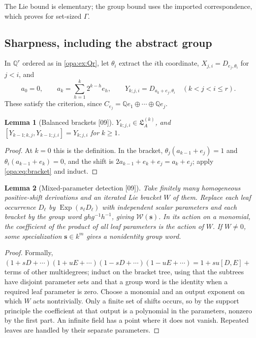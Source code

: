 \documentclass[11pt,oneside]{article}
\numberwithin{equation}{section}
\newtheorem{lemma}[lemma]{Lemma}
\theoremstyle{definition}
\theoremstyle{remark}
\newcommand{\Q}{\mathbb Q}
\newcommand{\LL}{\mathfrak L}
\newcommand{\Exp}{\operatorname{Exp}}
\newcommand{\src}[1]{\textup{\textsf{\small[#1]}}}
\begin{document}
The Lie bound is elementary; the group bound uses the imported
correspondence, which \cite{BKKPS} proves for set-sized $\Gamma$.

\subsection{Sharpness, including the abstract group}

In $\Q^r$ ordered as in \cref{opa:ex:Qr}, let $\theta_i$ extract the $i$th
coordinate, $X_{j,i}=D_{e_j,\theta_i}$ for $j<i$, and
\[
 a_0=0,\qquad a_k=\sum_{h=1}^k2^{k-h}e_h,\qquad
 Y_{k;j,i}=D_{a_k+e_j,\theta_i}\quad(k<j<i\le r).
\]
These satisfy the criterion, since $C_{e_j}=\Q e_1\oplus\cdots\oplus\Q e_j$.

\begin{lemma}[Balanced brackets \src{09}]\label{opa:lem:balanced}
$Y_{k;j,i}\in\LL_A^{(k)}$, and $[Y_{k-1;k,j},Y_{k-1;j,i}]=Y_{k;j,i}$ for $k\ge1$.
\end{lemma}
\begin{proof}
At $k=0$ this is the definition. In the bracket,
$\theta_j(a_{k-1}+e_j)=1$ and $\theta_i(a_{k-1}+e_k)=0$, and the shift is
$2a_{k-1}+e_k+e_j=a_k+e_j$; apply \eqref{opa:eq:bracket} and induct.
\end{proof}

\begin{lemma}[Mixed-parameter detection \src{09}]\label{opa:lem:mixed}
Take finitely many homogeneous positive-shift derivations and an iterated Lie
bracket $W$ of them. Replace each leaf occurrence $D_\ell$ by $\Exp(s_\ell D_\ell)$
with independent scalar parameters and each bracket by the group word
$ghg^{-1}h^{-1}$, giving $\mathcal W(\mathbf s)$. In its action on a monomial,
the coefficient of the product of all leaf parameters is the action of $W$. If
$W\ne0$, some specialization $\mathbf s\in k^m$ gives a nonidentity group word.
\end{lemma}
\begin{proof}
Formally, $(1+sD+\cdots)(1+uE+\cdots)(1-sD+\cdots)(1-uE+\cdots)=1+su[D,E]+{}$terms
of other multidegrees; induct on the bracket tree, using that the subtrees have
disjoint parameter sets and that a group word is the identity when a required
leaf parameter is zero. Choose a monomial and an output exponent on which $W$
acts nontrivially. Only a finite set of shifts occurs, so by the support
principle the coefficient at that output is a polynomial in the parameters,
nonzero by the first part. An infinite field has a point where it does not
vanish. Repeated leaves are handled by their separate parameters.
\end{proof}
\end{document}
